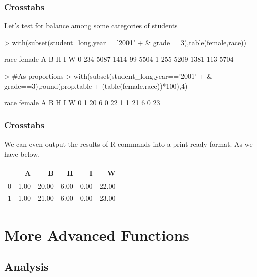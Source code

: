 \documentclass[12pt,handout]{beamer}
\begin{document}
  
\begin{frame}[containsverbatim]
\frametitle{Crosstabs}
Let's test for balance among some categories of students 
\begin{Schunk}
\begin{Sinput}
> with(subset(student_long,year=='2001' 
+             & grade==3),table(female,race))
\end{Sinput}
\begin{Soutput}
      race
female    A    B    H    I    W
     0  234 5087 1414   99 5504
     1  255 5209 1381  113 5704
\end{Soutput}
\end{Schunk}
\begin{Schunk}
\begin{Sinput}
> #As proportions
> with(subset(student_long,year=='2001' 
+             & grade==3),round(prop.table
+             (table(female,race))*100),4)
\end{Sinput}
\begin{Soutput}
      race
female  A  B  H  I  W
     0  1 20  6  0 22
     1  1 21  6  0 23
\end{Soutput}
\end{Schunk}
\end{frame}

\begin{frame}
\frametitle{Crosstabs}
We can even output the results of R commands into a print-ready format. As we have below.
\begin{table}[ht]
\begin{center}
\begin{tabular}{rrrrrr}
  \hline
 & A & B & H & I & W \\ 
  \hline
0 & 1.00 & 20.00 & 6.00 & 0.00 & 22.00 \\ 
  1 & 1.00 & 21.00 & 6.00 & 0.00 & 23.00 \\ 
   \hline
\end{tabular}
\end{center}
\end{table}\end{frame}

\section{More Advanced Functions}
\subsection{Analysis}
\end{document}
